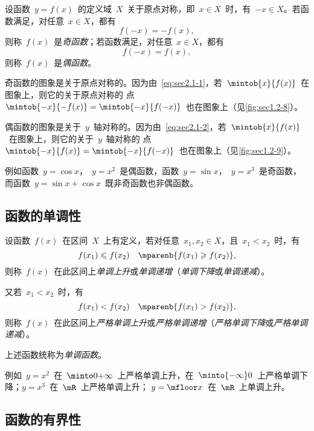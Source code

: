 设函数~$y=f(x)$~的定义域~$X$~关于原点对称，即~$x\in X$~时，有~$-x\in X$。若函数满足，对任意~$x\in X$，都有
\begin{equation}\label{eq:sec2.1-1}
f(-x)=-f(x),
\end{equation}
则称~$f(x)$~是\emph{奇函数}；若函数满足，对任意~$x\in X$，都有
\begin{equation}\label{eq:sec2.1-2}
f(-x)=f(x),
\end{equation}
则称~$f(x)$~是\emph{偶函数}。

奇函数的图象是关于原点对称的。因为由~\ref{eq:sec2.1-1}，若~$\mintob{x}{f(x)}$~在图象上，则它的关于原点对称的
点~$\mintob{-x}{-f(x)}=\mintob{-x}{f(-x)}$~也在图象上（见\ref{fig:sec1.2-8}）。

偶函数的图象是关于~$y$~轴对称的。因为由~\ref{eq:sec2.1-2}，若~$\mintob{x}{f(x)}$~在图象上，则它的关于~$y$~轴对称的
点~$\mintob{-x}{f(x)}=\mintob{-x}{f(-x)}$~也在图象上（见\ref{fig:sec1.2-9}）。

\begin{figure}
\begin{floatrow}[2]
          {\somefigure}
          {\somefigure}
\end{floatrow}
\end{figure}

例如函数~$y=\cos x$，~$y=x^2$~是偶函数，函数~$y=\sin x$，~$y=x^3$~是奇函数，而函数~$y=\sin x+\cos x$~既非奇函数也非偶函数。

\subsection{函数的单调性}

设函数~$f(x)$~在区间~$X$~上有定义，若对任意~$x_1,x_2\in X$，且~$x_1<x_2$~时，有
\[
  f(x_1)\leq f(x_2)\quad\mparenb{f(x_1)\geq f(x_2)},
\]
则称~$f(x)$~在此区间上\emph{单调上升}或\emph{单调递增}（\emph{单调下降}或\emph{单调递减}）。

又若~$x_1<x_2$~时，有
\[
  f(x_1)<f(x_2)\quad\mparenb{f(x_1)>f(x_2)},
\]
则称~$f(x)$~在此区间上\emph{严格单调上升}或\emph{严格单调递增}（\emph{严格单调下降}或\emph{严格单调递减}）。

上述函数统称为\emph{单调函数}。

例如~$y=x^2$~在~$\minto 0{+\infty}$~上严格单调上升，在~$\minto{-\infty}0$~上严格单调下降；$y=x^3$~在~$\mR$~上严格单调上升；%
$y=\mfloor x$~在~$\mR$~上单调上升。

\subsection{函数的有界性}

